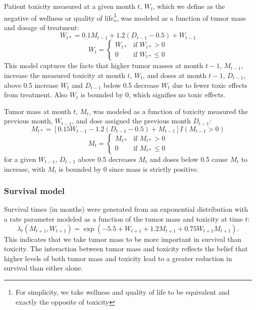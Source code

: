 \documentclass[12pt]{article}
\begin{document}
Patient toxicity measured at a given month $t$, $W_{t}$, which we define as the negative of wellness or quality of life\footnote{For simplicity, we take wellness and quality of life to be equivalent and exactly the opposite of toxicity}, was modeled as a function of tumor mass and dosage of treatment:
%
\begin{equation}
W_{t*} = 0.1 M_{t-1} + 1.2 (D_{t-1} - 0.5) + W_{t - 1}
\end{equation}
\begin{equation}
W_{t} = \begin{cases}
  W_{t*} &\text{if } W_{t*} > 0 \\
  0 &\text{if } W_{t*} \leq 0
\end{cases}
\end{equation}
This model captures the facts that higher tumor masses at month $t-1$, $M_{t-1}$, increase the measured toxicity at month $t$, $W_{t}$, and doses at month $t-1$, $D_{t -1}$, above 0.5 increase $W_{t}$ and $D_{t -1}$ below 0.5 decrease $W_{t}$ due to fewer toxic effects from treatment. Also $W_{t}$ is bounded by 0, which signifies no toxic effects.

Tumor mass at month $t$, $M_{t}$, was modeled as a function of toxicity measured the previous month, $W_{t-1}$, and dose assigned the previous month $D_{t-1}$:
%
\begin{equation}
M_{t*} = [0.15 W_{t-1} - 1.2 (D_{t-1} - 0.5) + M_{t - 1}] I(M_{t-1} > 0)
\end{equation}
\begin{equation}
M_{t} = \begin{cases}
  M_{t*} &\text{if } M_{t*} > 0 \\
  0 &\text{if } M_{t*} \leq 0
\end{cases}
\end{equation}
%
for a given $W_{t-1}$, $D_{t-1}$ above 0.5 decreases $M_{t}$ and doses below 0.5 cause $M_{t}$ to increase, with $M_{t}$ is bounded by 0 since mass is strictly positive.


\subsubsection{Survival model} %
\label{ssub:survival_model}

Survival times (in months) were generated from an exponential distribution with a rate parameter modeled as a function of the tumor mass and toxicity at time $t$:
\begin{equation}
  \lambda_{t}(M_{t+1}, W_{t+1}) = \exp(-5.5 + W_{t+1} + 1.2 M_{t+1} + 0.75 W_{t+1} M_{t+1}).
\end{equation}
This indicates that we take tumor mass to be more important in survival than toxicity. The interaction between tumor mass and toxicity reflects the belief that higher levels of both tumor mass and toxicity lead to a greater reduction in survival than either alone.
\end{document}
